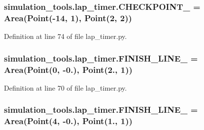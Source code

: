 \subsubsection[{\texorpdfstring{C\+H\+E\+C\+K\+P\+O\+I\+N\+T\+\_\+3}{CHECKPOINT_3}}]{\setlength{\rightskip}{0pt plus 5cm}simulation\+\_\+tools.\+lap\+\_\+timer.\+C\+H\+E\+C\+K\+P\+O\+I\+N\+T\+\_ = {\bf Area}({\bf Point}(-\/14, 1), {\bf Point}(2, 2))}\hypertarget{namespacesimulation__tools_1_1lap__timer_a197a8c1ba2497108f555aa4d1670ccd7}{}\label{namespacesimulation__tools_1_1lap__timer_a197a8c1ba2497108f555aa4d1670ccd7}


Definition at line 74 of file lap\+\_\+timer.\+py.

\subsubsection[{\texorpdfstring{F\+I\+N\+I\+S\+H\+\_\+\+L\+I\+N\+E\+\_\+1}{FINISH_LINE_1}}]{\setlength{\rightskip}{0pt plus 5cm}simulation\+\_\+tools.\+lap\+\_\+timer.\+F\+I\+N\+I\+S\+H\+\_\+\+L\+I\+N\+E\+\_ = {\bf Area}({\bf Point}(0, -\/0.), {\bf Point}(2., 1))}\hypertarget{namespacesimulation__tools_1_1lap__timer_ae7d1eef6c19d3320b71be19367ec7fbd}{}\label{namespacesimulation__tools_1_1lap__timer_ae7d1eef6c19d3320b71be19367ec7fbd}


Definition at line 70 of file lap\+\_\+timer.\+py.

\subsubsection[{\texorpdfstring{F\+I\+N\+I\+S\+H\+\_\+\+L\+I\+N\+E\+\_\+2}{FINISH_LINE_2}}]{\setlength{\rightskip}{0pt plus 5cm}simulation\+\_\+tools.\+lap\+\_\+timer.\+F\+I\+N\+I\+S\+H\+\_\+\+L\+I\+N\+E\+\_ = {\bf Area}({\bf Point}(4, -\/0.), {\bf Point}(1., 1))}\hypertarget{namespacesimulation__tools_1_1lap__timer_ac066eea03916600e5942b91bba4204fa}{}\label{namespacesimulation__tools_1_1lap__timer_ac066eea03916600e5942b91bba4204fa}


